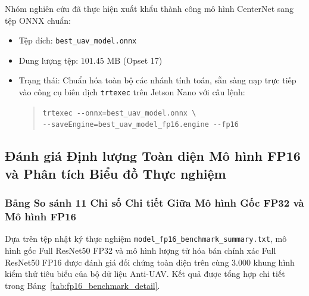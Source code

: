 \documentclass[11pt,a4paper]{article}
\begin{document}
Nhóm nghiên cứu đã thực hiện xuất khẩu thành công mô hình CenterNet sang tệp ONNX chuẩn:
\begin{itemize}
    \item Tệp đích: {\texttt{best\_uav\_model.onnx}}
    \item Dung lượng tệp: $101.45\text{ MB}$ (Opset 17)
    \item Trạng thái: Chuẩn hóa toàn bộ các nhánh tính toán, sẵn sàng nạp trực tiếp vào công cụ biên dịch \texttt{trtexec} trên Jetson Nano với câu lệnh:
    \begin{quote}
    \centering
    {\small{}\texttt{trtexec -{}-onnx=best\_uav\_model.onnx \textbackslash} \\
    \texttt{\qquad -{}-saveEngine=best\_uav\_model\_fp16.engine -{}-fp16}}
    \end{quote}
\end{itemize}

\subsection{Đánh giá Định lượng Toàn diện Mô hình FP16 và Phân tích Biểu đồ Thực nghiệm}
\label{subsec:fp16_benchmark_evaluation}

\subsubsection{Bảng So sánh 11 Chỉ số Chi tiết Giữa Mô hình Gốc FP32 và Mô hình FP16}
Dựa trên tệp nhật ký thực nghiệm {\texttt{model\_fp16\_benchmark\_summary.txt}}, mô hình gốc Full ResNet50 FP32 và mô hình lượng tử hóa bán chính xác Full ResNet50 FP16 được đánh giá đối chứng toàn diện trên cùng 3.000 khung hình kiểm thử tiêu biểu của bộ dữ liệu Anti-UAV. Kết quả được tổng hợp chi tiết trong Bảng~\ref{tab:fp16_benchmark_detail}.
\end{document}
